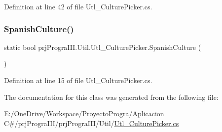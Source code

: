 Definition at line 42 of file Utl\+\_\+\+Culture\+Picker.\+cs.

\hypertarget{classprj_progra_i_i_i_1_1_util_1_1_utl___culture_picker_a4db175f0a2e18afa3bb5212eeba01f26}{}\label{classprj_progra_i_i_i_1_1_util_1_1_utl___culture_picker_a4db175f0a2e18afa3bb5212eeba01f26} 
\subsubsection{\texorpdfstring{Spanish\+Culture()}{SpanishCulture()}}
{\footnotesize\ttfamily static bool prj\+Progra\+I\+I\+I.\+Util.\+Utl\+\_\+\+Culture\+Picker.\+Spanish\+Culture (\begin{DoxyParamCaption}{ }\end{DoxyParamCaption})\hspace{0.3cm}{\ttfamily [static]}}



Definition at line 15 of file Utl\+\_\+\+Culture\+Picker.\+cs.



The documentation for this class was generated from the following file\+:\begin{DoxyCompactItemize}
\item 
E\+:/\+One\+Drive/\+Workspace/\+Proyecto\+Progra/\+Aplicacion C\#/prj\+Progra\+I\+I\+I/prj\+Progra\+I\+I\+I/\+Util/\hyperlink{_utl___culture_picker_8cs}{Utl\+\_\+\+Culture\+Picker.\+cs}\end{DoxyCompactItemize}
